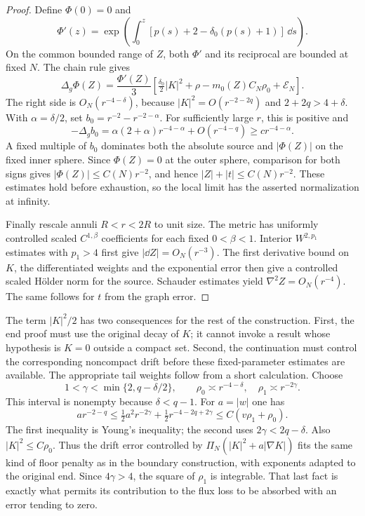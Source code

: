 \begin{proof}
Define $\Phi(0)=0$ and
\[
 \Phi'(z)=\exp\!\left(\int_0^z
     [p(s)+2-\delta_0(p(s)+1)]\,\dd s\right).
\]
On the common bounded range of $Z$, both $\Phi'$ and its reciprocal
are bounded at fixed $N$.  The chain rule gives
\[
 \Delta_g\Phi(Z)=\frac{\Phi'(Z)}3
 \left[\tfrac{\delta_0}{2}|K|^2+\rho
       -m_0(Z)C_N\rho_0+\mathcal E_N\right].
\]
The right side is $O_N(r^{-4-\delta})$, because
$|K|^2=O(r^{-2-2q})$ and $2+2q>4+\delta$.
With $\alpha=\delta/2$, set $b_0=r^{-2}-r^{-2-\alpha}$.
For sufficiently large $r$, this is positive and
\[
 -\Delta_g b_0
 =\alpha(2+\alpha)r^{-4-\alpha}+O(r^{-4-q})
 \ge c r^{-4-\alpha}.
\]
A fixed multiple of $b_0$ dominates both the absolute source and
$|\Phi(Z)|$ on the fixed inner sphere.  Since $\Phi(Z)=0$ at the outer
sphere, comparison for both signs gives $|\Phi(Z)|\le C(N)r^{-2}$,
and hence $|Z|+|t|\le C(N)r^{-2}$.  These estimates hold before
exhaustion, so the local limit has the asserted normalization at
infinity.

Finally rescale annuli $R<r<2R$ to unit size.  The metric has uniformly
controlled scaled $C^{1,\beta}$ coefficients for each fixed $0<\beta<1$.
Interior $W^{2,p_1}$ estimates with $p_1>4$ first give
$|\dd Z|=O_N(r^{-3})$.  The first derivative bound on $K$, the
differentiated weights and the exponential error then give a controlled
scaled H\"older norm for the source.  Schauder estimates yield
$\nabla^2Z=O_N(r^{-4})$.  The same follows for $t$ from the graph error.
\end{proof}

The term $|K|^2/2$ has two consequences for the rest of the construction.
First, the end proof must use the original decay of $K$; it cannot invoke
a result whose hypothesis is $K=0$ outside a compact set.  Second, the
continuation must control the corresponding noncompact drift before
these fixed-parameter estimates are available.  The appropriate tail
weights follow from a short calculation.  Choose
\[
 1<\gamma<\min\{2,q-\delta/2\},\qquad
 \rho_0\asymp r^{-4-\delta},\quad \rho_1\asymp r^{-2\gamma}.
\]
This interval is nonempty because $\delta<q-1$.
For $a=|w|$ one has
\begin{equation}\label{b:transition:tail-budget}
 a r^{-2-q}
 \le\tfrac12a^2r^{-2\gamma}
       +\tfrac12r^{-4-2q+2\gamma}
 \le C(v\rho_1+\rho_0).
\end{equation}
The first inequality is Young's inequality; the second uses
$2\gamma<2q-\delta$.  Also $|K|^2\le C\rho_0$.
Thus the drift error controlled by
$\Pi_N(|K|^2+a|\nabla K|)$ fits the same kind of floor penalty as
in the boundary construction, with exponents adapted to the original
end.  Since $4\gamma>4$, the square of $\rho_1$ is integrable.
That last fact is exactly what permits its contribution to the flux
loss to be absorbed with an error tending to zero.

